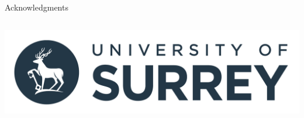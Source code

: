 \documentclass[aspectratio=43, dvipsnames]{beamer}
\begin{document}
\begin{frame}[plain]{Acknowledgments}
\begin{columns}[T]
\begin{column}{0.33\linewidth}
            \includegraphics[width=0.6\linewidth]{logos/surrey.png}\vspace{1em}
        \end{column}
    \end{columns}
\end{frame}
\end{document}
